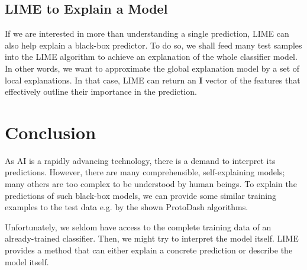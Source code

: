 \documentclass[output=paper,colorlinks,citecolor=brown
]{langscibook}
\begin{document}
\subsection{LIME to Explain a Model}
If we are interested in more than understanding a single prediction, LIME can also help explain a black-box predictor. To do so, we shall feed many test samples into the LIME algorithm to achieve an explanation of the whole classifier model. In other words, we want to approximate the global explanation model by a set of local explanations. In that case, LIME can return an $\mathbf{I}$ vector of the features that effectively outline their importance in the prediction.

\section{Conclusion}
As AI is a rapidly advancing technology, there is a demand to interpret its predictions. However, there are many comprehensible, self-explaining models; many others are too complex to be understood by human beings. To explain the predictions of such black-box models, we can provide some similar training examples to the test data e.g. by the shown ProtoDash algorithms.

Unfortunately, we seldom have access to the complete training data of an already-trained classifier. Then, we might try to interpret the model itself. LIME provides a method that can either explain a concrete prediction or describe the model itself.

\sloppy
\printbibliography[heading=subbibliography,notkeyword=this]
\end{document}
